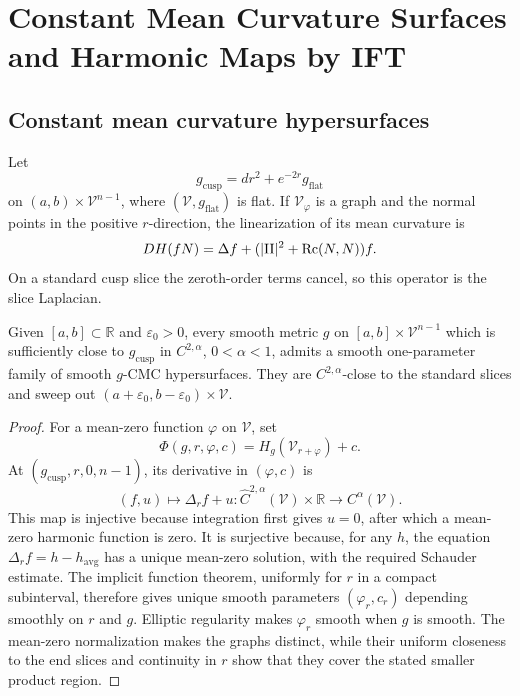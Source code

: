\chapter[34]{Constant Mean Curvature Surfaces and Harmonic Maps by IFT}
\label{ch:chow-iv-cmc-surfaces-harmonic-maps-ift}

\section{Constant mean curvature hypersurfaces}

Let
\[
 g_{\mathrm{cusp}}=dr^2+e^{-2r}g_{\mathrm{flat}}
\]
on \((a,b)\times\mathcal V^{n-1}\), where \((\mathcal V,g_{\mathrm{flat}})\)
is flat.  If \(\mathcal V_\varphi\) is a graph and the normal points in the
positive \(r\)-direction, the linearization of its mean curvature is
\[
 DH(fN)=\Delta f+(|\mathrm{II}|^2+\operatorname{Rc}(N,N))f.
\]
On a standard cusp slice the zeroth-order terms cancel, so this operator is
the slice Laplacian.

\begin{proposition}
\label{prop:chow-iv-cmc-sweepout-almost-hyperbolic-cusp}

Given \([a,b]\subset\mathbb R\) and \(\varepsilon_0>0\), every smooth metric
\(g\) on \([a,b]\times\mathcal V^{n-1}\) which is sufficiently close to
\(g_{\mathrm{cusp}}\) in \(C^{2,\alpha}\), \(0<\alpha<1\), admits a smooth
one-parameter family of smooth \(g\)-CMC hypersurfaces.  They are
\(C^{2,\alpha}\)-close to the standard slices and sweep out
\((a+\varepsilon_0,b-\varepsilon_0)\times\mathcal V\).
\end{proposition}
\begin{proof}
\sketch
For a mean-zero function \(\varphi\) on \(\mathcal V\), set
\[
 \Phi(g,r,\varphi,c)=H_g(\mathcal V_{r+\varphi})+c.
\]
At \((g_{\mathrm{cusp}},r,0,n-1)\), its derivative in \((\varphi,c)\) is
\[
 (f,u)\longmapsto\Delta_r f+u
 :\widehat C^{2,\alpha}(\mathcal V)\times\mathbb R
 \longrightarrow C^\alpha(\mathcal V).
\]
This map is injective because integration first gives \(u=0\), after which a
mean-zero harmonic function is zero.  It is surjective because, for any
\(h\), the equation \(\Delta_r f=h-h_{\mathrm{avg}}\) has a unique mean-zero
solution, with the required Schauder estimate.  The implicit function theorem,
uniformly for \(r\) in a compact subinterval, therefore gives unique smooth
parameters \((\varphi_r,c_r)\) depending smoothly on \(r\) and \(g\).
Elliptic regularity makes \(\varphi_r\) smooth when \(g\) is smooth.  The
mean-zero normalization makes the graphs distinct, while their uniform
closeness to the end slices and continuity in \(r\) show that they cover the
stated smaller product region.
\end{proof}

